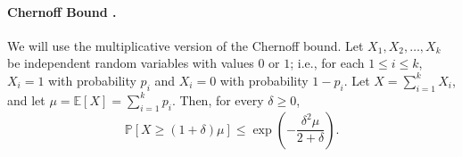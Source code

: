 \paragraph{Chernoff Bound \cite{Chernoff:1952aa}.}
We will use the multiplicative version of the Chernoff bound.
Let \( X_1, X_2, \dots, X_k \) be independent random variables with values \( 0 \) or \( 1 \); i.e., for each \( 1 \leq i \leq k \), \( X_i = 1 \) with probability \( p_i \) and \( X_i = 0 \) with probability \( 1 - p_i \).
Let \( X = \sum_{i = 1} ^k X_i \), and let \( \mu = \mathbb E \left[ X \right] = \sum_{i = 1} ^k p_i \).
Then, for every \( \delta \geq 0 \),
\begin{equation} \label{eq:Chernoff}
\mathbb P \left[ X \geq (1 + \delta) \mu \right] \leq \exp\left( - \frac{\delta ^2 \mu}{2 + \delta}  \right).
\end{equation}


